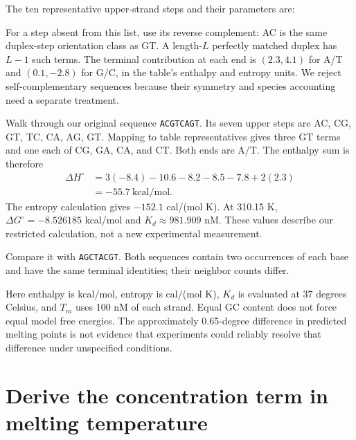
The ten representative upper-strand steps and their parameters are:
\begin{center}\small\end{center}
For a step absent from this list, use its reverse complement: AC is the
same duplex-step orientation class as GT. A length-$L$ perfectly matched
duplex has $L-1$ such terms. The terminal contribution at each end is
$(2.3,4.1)$ for A/T and $(0.1,-2.8)$ for G/C, in the table's enthalpy
and entropy units. We reject self-complementary sequences because their
symmetry and species accounting need a separate treatment.


Walk through our original sequence \texttt{ACGTCAGT}. Its seven upper
steps are AC, CG, GT, TC, CA, AG, GT. Mapping to table representatives gives
three GT terms and one each of CG, GA, CA, and CT. Both ends are A/T.
The enthalpy sum is therefore
\begin{align}
\Delta H^\circ
&=3(-8.4)-10.6-8.2-8.5-7.8+2(2.3)\\
&=-55.7\ \mathrm{kcal/mol}.
\end{align}
The entropy calculation gives $-152.1$ cal/(mol K).
At 310.15 K, $\Delta G^\circ=-8.526185$ kcal/mol and
$K_d\approx981.909$ nM. These values describe our restricted calculation,
not a new experimental measurement.

Compare it with \texttt{AGCTACGT}. Both sequences contain two occurrences
of each base and have the same terminal identities; their neighbor counts differ.
\begin{center}\small\end{center}
Here enthalpy is kcal/mol, entropy is cal/(mol K), $K_d$ is evaluated at
37 degrees Celsius, and $T_m$ uses 100 nM of each strand. Equal GC content
does not force equal model free energies. The approximately 0.65-degree
difference in predicted melting points is not evidence that experiments
could reliably resolve that difference under unspecified conditions.

\section{Derive the concentration term in melting temperature}

